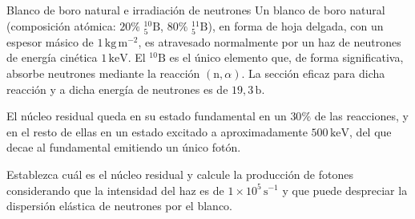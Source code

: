 
\begin{Ejercicio}{Blanco de boro natural e irradiación de neutrones}\label{Ej:08}
Un blanco de boro natural (composición atómica: $20\%$ ${}^{10}_{5}\mathrm{B}$, $80\%$ ${}^{11}_{5}\mathrm{B}$), en forma de hoja delgada, con un espesor másico de $1\,\mathrm{kg\,m^{-2}}$, es atravesado normalmente por un haz de neutrones de energía cinética $1\,\mathrm{keV}$.  
El ${}^{10}\mathrm{B}$ es el único elemento que, de forma significativa, absorbe neutrones mediante la reacción $(\mathrm{n},\alpha)$. La sección eficaz para dicha reacción y a dicha energía de neutrones es de $19{,}3\,\mathrm{b}$.  

El núcleo residual queda en su estado fundamental en un $30\%$ de las reacciones, y en el resto de ellas en un estado excitado a aproximadamente $500\,\mathrm{keV}$, del que decae al fundamental emitiendo un único fotón. 

Establezca cuál es el núcleo residual y calcule la producción de fotones considerando que la intensidad del haz es de $1\times10^{5}\,\mathrm{s^{-1}}$ y que puede despreciar la dispersión elástica de neutrones por el blanco.
\end{Ejercicio}


